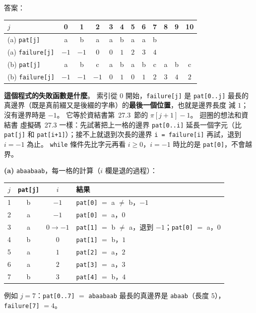 \begin{pastsoln}
答案：
\begin{center}
\begin{tabular}{l*{11}{c}}
\toprule
$j$ & 0 & 1 & 2 & 3 & 4 & 5 & 6 & 7 & 8 & 9 & 10 \\
\midrule
(a) \texttt{pat[j]} & a & b & a & a & b & a & a & b \\
(a) \texttt{failure[j]} & $-1$ & $-1$ & $0$ & $0$ & $1$ & $2$ & $3$ & $4$ \\
\midrule
(b) \texttt{pat[j]} & a & b & c & a & b & a & b & c & a & b & c \\
(b) \texttt{failure[j]} & $-1$ & $-1$ & $-1$ & $0$ & $1$ & $0$ & $1$ & $2$ & $3$ & $4$ & $2$ \\
\bottomrule
\end{tabular}
\end{center}

\textbf{這個程式的失敗函數是什麼}。 索引從 $0$ 開始，\texttt{failure[j]} 是
\texttt{pat[0..j]} 最長的真邊界（既是真前綴又是後綴的字串）的\textbf{最後一個位置}，也就是邊界長度
減 $1$；沒有邊界時是 $-1$。 它等於資結書第~27.3~節的 $\pi[j+1] - 1$。 迴圈的想法和資結書
虛擬碼~27.3 一樣：先試著把上一格的邊界 \texttt{pat[0..i]} 延長一個字元（比 \texttt{pat[j]} 和
\texttt{pat[i+1]}）；接不上就退到次長的邊界 \texttt{i = failure[i]} 再試，退到 $i = -1$ 為止。
\texttt{while} 條件先比字元再看 $i \ge 0$，$i = -1$ 時比的是 \texttt{pat[0]}，不會越界。

\textbf{(a)} \texttt{abaabaab}，每一格的計算（$i$ 欄是退的過程）：
\begin{center}
\small
\begin{tabular}{cccl}
\toprule
$j$ & \texttt{pat[j]} & $i$ & 結果 \\
\midrule
1 & b & $-1$ & \texttt{pat[0]} $=$ a $\ne$ b，$-1$ \\
2 & a & $-1$ & \texttt{pat[0]} $=$ a，$0$ \\
3 & a & $0 \to -1$ & \texttt{pat[1]} $=$ b $\ne$ a，退到 $-1$；\texttt{pat[0]} $=$ a，$0$ \\
4 & b & $0$ & \texttt{pat[1]} $=$ b，$1$ \\
5 & a & $1$ & \texttt{pat[2]} $=$ a，$2$ \\
6 & a & $2$ & \texttt{pat[3]} $=$ a，$3$ \\
7 & b & $3$ & \texttt{pat[4]} $=$ b，$4$ \\
\bottomrule
\end{tabular}
\end{center}
例如 $j = 7$：\texttt{pat[0..7]} $=$ \texttt{abaabaab} 最長的真邊界是 \texttt{abaab}（長度 $5$），
\texttt{failure[7]} $= 4$。


\end{pastsoln}
